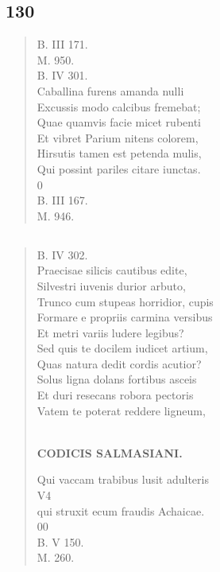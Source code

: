 \documentclass[11pt, a4paper]{report}
\begin{document}
            \subsection*{130}
      \begin{verse}
      B. III 171. \\ M. 950. \\ B. IV 301. \\ Caballina furens amanda nulli \\ Excussis modo calcibus fremebat; \\ Quae quamvis facie micet rubenti \\ Et vibret Parium nitens colorem, \\ Hirsutis tamen est petenda mulis, \\ Qui possint pariles citare iunctas. \\ 0 \\ B. III 167. \\ M. 946. \\ 
      \end{verse}
  
            \subsection*{}
      \begin{verse}
      B. IV 302. \\ Praecisae silicis cautibus edite, \\ Silvestri iuvenis durior arbuto, \\ Trunco cum stupeas horridior, cupis \\ Formare  \lbrack e propriis carmina versibus \\ Et metri variis ludere legibus? \\ Sed quis te docilem iudicet artium, \\ Quas natura dedit cordis acutior? \\ Solus ligna dolans fortibus asceis \\ Et duri resecans robora pectoris \\ Vatem te poterat reddere ligneum, \\ 
        ﻿\pagebreak 
    \begin{center} \textbf{CODICIS SALMASIANI.} \end{center} \marginpar{[139]} Qui vaccam trabibus lusit adulteris \\ V4 \\ qui struxit ecum fraudis Achaicae. \\ 00 \\ B. V 150. \\ M. 260. \\ 
      \end{verse}
  
\end{document}
